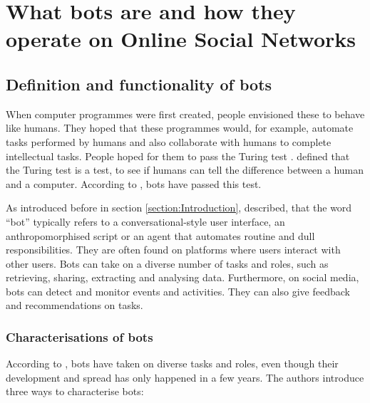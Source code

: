 \section{What bots are and how they operate on Online Social Networks}
\label{section:WhatBotsAre}
    
    \subsection{Definition and functionality of bots}
    \label{subsection:DefinintionAndFunctionalityBots}
        When computer programmes were first created, people envisioned these to behave like humans. They hoped that these programmes would, for example, automate tasks performed by humans and also collaborate with humans to complete intellectual tasks. People hoped for them to pass the Turing test \autocite[18]{SoftwareBots}. \textcite[25]{turing2009} defined that the Turing test is a test, to see if humans can tell the difference between a human and a computer. According to \textcite[18]{SoftwareBots}, bots have passed this test. 
        
        As introduced before in section \ref{section:Introduction}, \textcite[18]{SoftwareBots} described, that the word “bot” typically refers to a conversational-style user interface, an anthropomorphised script or an agent that automates routine and dull responsibilities. They are often found on platforms where users interact with other users. Bots can take on a diverse number of tasks and roles, such as retrieving, sharing, extracting and analysing data. Furthermore, on social media, bots can detect and monitor events and activities. They can also give feedback and recommendations on tasks.
    
        \subsubsection{Characterisations of bots}
            According to \textcite[19]{SoftwareBots}, bots have taken on diverse tasks and roles, even though their development and spread has only happened in a few years. The authors introduce three ways to characterise bots:
            
